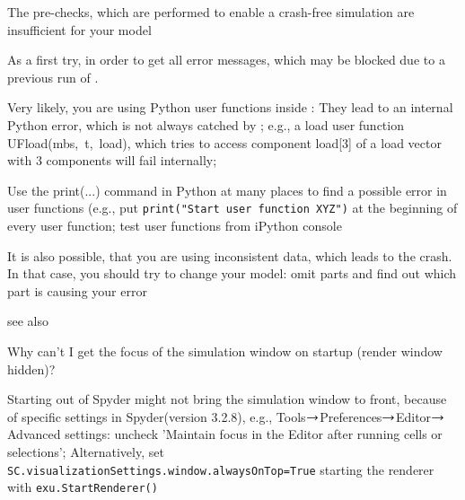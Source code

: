 %
\item[$\ra$] The pre-checks, which are performed to enable a crash-free simulation are insufficient for your model
%
\item[$\ra$] As a first try,  in order to get all error messages, which may be blocked due to a previous run of \codeName.
%
\item[$\ra$] Very likely, you are using Python user functions inside \codeName: They lead to an internal Python error, which is not always catched by \codeName; e.g., a load user function UFload(mbs,~t,~load), which tries to access component load[3] of a load vector with 3 components will fail internally;
%
\item[$\ra$] Use the print(...) command in Python at many places to find a possible error in user functions (e.g., put \texttt{print("Start user function XYZ")} at the beginning of every user function; test user functions from iPython console
%
\item[$\ra$] It is also possible, that you are using inconsistent data, which leads to the crash. In that case, you should try to change your model: omit parts and find out which part is causing your error
%
\item[$\ra$] see also 
\ei

\item Why can't I get the focus of the simulation window on startup (render window hidden)?
\bi
\item[$\ra$] Starting \codeName out of Spyder might not bring the simulation window to front, because of specific settings in Spyder(version 3.2.8), e.g., Tools$\ra$Preferences$\ra$Editor$\ra$Advanced settings: uncheck 'Maintain focus in the Editor after running cells or selections'; Alternatively, set \texttt{SC.visualizationSettings.window.alwaysOnTop=True}  starting the renderer with \texttt{exu.StartRenderer()}
\ei
%
\en


